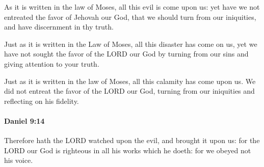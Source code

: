 			\begin{versebox}
					\item[BHS] 
					\item[LXX] 
					\item[ASV] As it is written in the law of Moses, all this evil is come upon us: yet have we not entreated the favor of Jehovah our God, that we should turn from our iniquities, and have discernment in thy truth.
					\item[NIV] Just as it is written in the Law of Moses, all this disaster has come on us, yet we have not sought the favor of the LORD our God by turning from our sins and giving attention to your truth.
					\item[NRSV] Just as it is written in the law of Moses, all this calamity has come upon us. We did not entreat the favor of the LORD our God, turning from our iniquities and reflecting on his fidelity.
			\end{versebox}

		\paragraph{Daniel 9:14} %
			\label{DANIEL-9-14}

			Therefore hath the LORD watched upon the evil, and brought it upon us: for the LORD our God is righteous in all his works which he doeth: for we obeyed not his voice.

